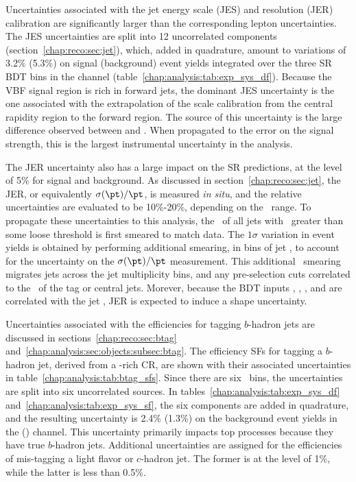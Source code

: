 


Uncertainties associated with the jet energy scale (JES) and
resolution (JER) calibration are significantly larger than the
corresponding lepton uncertainties. The JES uncertainties are split
into 12 uncorrelated components (section~\ref{chap:reco:sec:jet}), which, added in quadrature,
amount to variations of 3.2\% (5.3\%) on signal (background) event
yields integrated over the three SR BDT bins in the \emme channel
(table~\ref{chap:analysis:tab:exp_sys_df}). Because the VBF signal
region is rich in forward jets, the dominant JES
uncertainty is the one associated with the extrapolation of the scale
calibration from the central rapidity region to the forward
region. The source of this uncertainty is the large difference
observed between \POWHEG and \HERWIG. When propagated to the error on
the signal strength, this is the
largest instrumental uncertainty in the analysis. 

The JER uncertainty also has a large impact on the SR predictions, at the level of 5\% for
signal and background. As discussed in
section~\ref{chap:reco:sec:jet}, the JER, or equivalently
$\sigma{(\pt)}/\pt$, is measured {\it in situ}, and the relative
uncertainties are evaluated to be 10\%-20\%, depending on
the \pt~range. To propagate these uncertainties to this analysis,
the \pt~of all jets with \pt~greater than some loose threshold is
first smeared to match data. The $1\sigma$
variation in event yields is obtained by performing additional
smearing, in bins of jet \pt, to account for the uncertainty on the $\sigma{(\pt)}/\pt$
measurement. This additional \pt~smearing migrates jets across the jet
multiplicity bins, and any pre-selection cuts correlated to the \pt~of
the tag or central jets. Morever, because the BDT
inputs \mjj, \dyjj, \SumMlj, and \lepEtaCent are correlated with the
jet \pt, JER is expected to induce a shape uncertainty.

Uncertainties associated with the efficiencies for tagging $b$-hadron jets are
discussed in sections~\ref{chap:reco:sec:btag}
and~\ref{chap:analysis:sec:objects:subsec:btag}. The efficiency SFs for tagging a
$b$-hadron jet, derived from a \ttbar-rich CR, are shown with their
associated uncertainties in
table~\ref{chap:analysis:tab:btag_sfs}. Since there are six \pt~bins,
the uncertainties are split into six uncorrelated sources. In
tables~\ref{chap:analysis:tab:exp_sys_df} and~\ref{chap:analysis:tab:exp_sys_sf},
the six components are added in quadrature, and the resulting
uncertainty is 2.4\% (1.3\%) on the background event yields in
the \emme (\eemm) channel. This uncertainty primarily impacts top
processes because they have true $b$-hadron jets. Additional
uncertainties are assigned for the efficiencies of mis-tagging a light
flavor or $c$-hadron jet. The former is at the level of 1\%, while the
latter is less than 0.5\%. 

